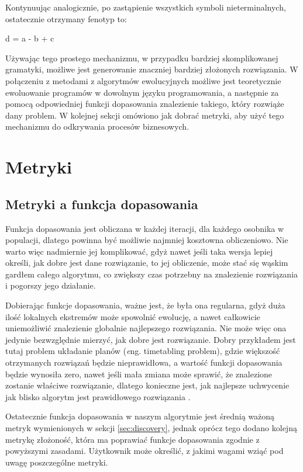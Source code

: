 Kontynuując analogicznie, po zastąpienie wszystkich symboli nieterminalnych, ostatecznie otrzymany fenotyp to:
\begin{center} d = a - b + c \end{center}	
Używając tego prostego mechanizmu, w przypadku bardziej skomplikowanej gramatyki, możliwe jest generowanie znaczniej bardziej złożonych rozwiązania. W połączeniu z metodami z algorytmów ewolucyjnych możliwe jest teoretycznie ewoluowanie programów w dowolnym języku programowania, a następnie za pomocą odpowiedniej funkcji dopasowania znalezienie takiego, który rozwiąże dany problem. W kolejnej sekcji omówiono jak dobrać metryki, aby użyć tego mechanizmu do odkrywania procesów biznesowych.



\section{Metryki}
\label{sec:metryki}

\subsection{Metryki a funkcja dopasowania}

Funkcja dopasowania jest obliczana w każdej iteracji, dla każdego osobnika w populacji, dlatego powinna być możliwie najmniej kosztowna obliczeniowo. Nie warto więc nadmiernie jej komplikować, gdyż nawet jeśli taka wersja lepiej określi, jak dobre jest dane rozwiązanie, to jej obliczenie, może stać się wąskim gardłem całego algorytmu, co zwiększy czas potrzebny na znalezienie rozwiązania i pogorszy jego działanie. 

Dobierając funkcje dopasowania, ważne jest, że była ona regularna, gdyż duża ilość lokalnych ekstremów może spowolnić ewolucję, a nawet całkowicie uniemożliwić znalezienie globalnie najlepszego rozwiązania.
Nie może więc ona jedynie bezwzględnie mierzyć, jak dobre jest rozwiązanie. Dobry przykładem jest tutaj problem układanie planów (\textit eng. timetabling problem), gdzie większość otrzymanych rozwiązań będzie nieprawidłowa, a wartość funkcji dopasowania będzie wynosiła zero, nawet jeśli mała zmiana może sprawić, że znalezione zostanie właściwe rozwiązanie, dlatego konieczne jest, jak najlepsze uchwycenie jak blisko algorytm jest prawidłowego rozwiązania \cite{icga85:cramer} \cite{beasley:1993:ogapf}.

Ostatecznie funkcja dopasowania w naszym algorytmie jest średnią ważoną metryk wymienionych w sekcji \ref{sec:discovery}, jednak oprócz tego dodano kolejną metrykę złożoność, która ma poprawiać funkcje dopasowania zgodnie z powyższymi zasadami. Użytkownik może określić, z jakimi wagami wziąć pod uwagę poszczególne metryki.

